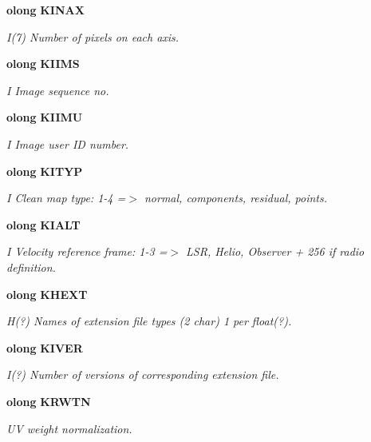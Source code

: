 \begin{CompactItemize}
{\bf olong} {\bf KINAX}
\begin{CompactList}\small\item\em I(7) Number of pixels on each axis. \item\end{CompactList}\item 
{\bf olong} {\bf KIIMS}
\begin{CompactList}\small\item\em I Image sequence no. \item\end{CompactList}\item 
{\bf olong} {\bf KIIMU}
\begin{CompactList}\small\item\em I Image user ID number. \item\end{CompactList}\item 
{\bf olong} {\bf KITYP}
\begin{CompactList}\small\item\em I Clean map type: 1-4 =$>$ normal, components, residual, points. \item\end{CompactList}\item 
{\bf olong} {\bf KIALT}
\begin{CompactList}\small\item\em I Velocity reference frame: 1-3 =$>$ LSR, Helio, Observer + 256 if radio definition. \item\end{CompactList}\item 
{\bf olong} {\bf KHEXT}
\begin{CompactList}\small\item\em H(?) Names of extension file types (2 char) 1 per float(?). \item\end{CompactList}\item 
{\bf olong} {\bf KIVER}
\begin{CompactList}\small\item\em I(?) Number of versions of corresponding extension file. \item\end{CompactList}\item 
{\bf olong} {\bf KRWTN}
\begin{CompactList}\small\item\em UV weight normalization. \item\end{CompactList}\item 

\end{CompactItemize}
